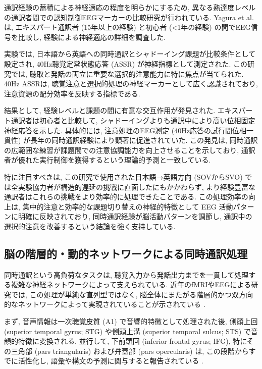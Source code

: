 通訳経験の蓄積による神経適応の程度を明らかにするため, 異なる熟達度レベルの通訳者間での認知制御EEGマーカーの比較研究が行われている.
Yagura et al. \cite{yagura2021selective} は, エキスパート通訳者 (15年以上の経験) と初心者 (<1年の経験) の間でEEG信号を比較し, 経験による神経適応の詳細を調査した.

実験では, 日本語から英語への同時通訳とシャドーイング課題が比較条件として設定され, 40Hz聴覚定常状態応答 (ASSR) が神経指標として測定された.
この研究では, 聴取と発話の両立に重要な選択的注意能力に特に焦点が当てられた.
40Hz ASSRは, 聴覚注意と選択的処理の神経マーカーとして広く認識されており, 注意資源の配分効率を反映する指標である.

結果として, 経験レベルと課題の間に有意な交互作用が発見された.
エキスパート通訳者は初心者と比較して, シャドーイングよりも通訳中により高い位相固定神経応答を示した.
具体的には, 注意処理のEEG測定 (40Hz応答の試行間位相一貫性) が長年の同時通訳経験により顕著に促進されていた.
この発見は, 同時通訳の広範囲な練習が課題間での注意協調能力を向上させることを示しており, 通訳者が優れた実行制御を獲得するという理論的予測と一致している.

特に注目すべきは, この研究で使用された日本語→英語方向 (SOVからSVO) では全実験協力者が構造的遅延の挑戦に直面したにもかかわらず, より経験豊富な通訳者はこれらの挑戦をより効率的に処理できたことである.
この処理効率の向上は, 集中的注意と効率的な課題切り替えの神経的特徴として EEG 活動パターンに明確に反映されており, 同時通訳経験が脳活動パターンを調節し, 通訳中の選択的注意を改善するという結論を強く支持している.

\subsection{脳の階層的・動的ネットワークによる同時通訳処理}

同時通訳という高負荷なタスクは, 聴覚入力から発話出力までを一貫して処理する複雑な神経ネットワークによって支えられている.
近年のfMRIやEEGによる研究では, この処理が単純な直列型ではなく, 脳全体にまたがる階層的かつ双方向的なネットワークによって実現されていることが示されている \cite{Caucheteux2023Predictive,Jiang2024DPC}.

まず, 音声情報は一次聴覚皮質 (A1) で音響的特徴として処理された後, 側頭上回 (superior temporal gyrus; STG) や側頭上溝 (superior temporal sulcus; STS) で音韻的特徴に変換される.
並行して, 下前頭回 (inferior frontal gyrus; IFG), 特にその三角部 (pars triangularis) および弁蓋部 (pars opercularis) は, この段階からすでに活性化し, 語彙や構文の予測に関与すると報告されている \cite{King2025WhatWhen}.


